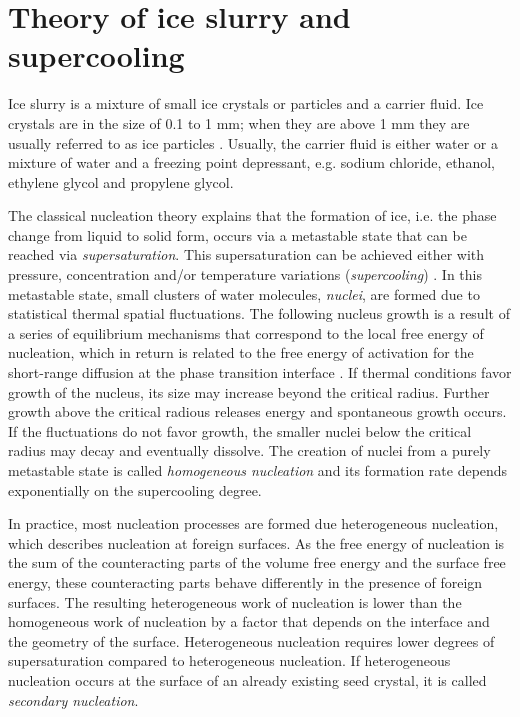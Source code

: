 
\section{Theory of ice slurry and supercooling}
\label{chapter_theory}

Ice slurry is a mixture of small ice crystals or particles and a carrier fluid. Ice crystals are in the size of 0.1 to 1 mm; when they are above 1 mm they are usually referred to as ice particles \citep{kauffeld_ice_2010}.
Usually, the carrier fluid is either water or a mixture of water and a freezing point depressant, e.g. sodium chloride, ethanol, ethylene glycol and propylene glycol. 


The classical nucleation theory \citep{turnbull_rate_1949} explains that the formation of ice, i.e. the phase change from liquid to solid form, occurs via a metastable state that can be reached via \emph{supersaturation}. This supersaturation can be achieved either with pressure, concentration and/or temperature variations (\emph{supercooling}) \citep{kauffeld_handbooks_2005}. In this metastable state, small clusters of water molecules, \emph{nuclei}, are formed due to statistical thermal spatial fluctuations. The following nucleus growth is a result of a series of equilibrium mechanisms that correspond to the local free energy of nucleation, which in return is related to the free energy of activation for the short-range diffusion at the phase transition interface \citep{turnbull_rate_1949}. If thermal conditions favor growth of the nucleus, its size may increase beyond the critical radius. Further growth above the critical radious releases energy and spontaneous growth occurs. If the fluctuations do not favor growth, the smaller nuclei below the critical radius may decay and eventually dissolve. The creation of nuclei from a purely metastable state is called \emph{homogeneous nucleation} and its formation rate depends exponentially on the supercooling degree. 

In practice, most nucleation processes are formed due heterogeneous nucleation, which describes nucleation at foreign surfaces. As the free energy of nucleation is the sum of the counteracting parts of the volume free energy and the surface free energy, these counteracting parts behave differently in the presence of foreign surfaces. The resulting heterogeneous work of nucleation  is lower than the homogeneous work of nucleation by a factor that depends on the interface and the geometry of the surface. Heterogeneous nucleation requires lower degrees of supersaturation compared to heterogeneous nucleation. If heterogeneous nucleation occurs at the surface of an already existing seed crystal, it is called \emph{secondary nucleation}.

